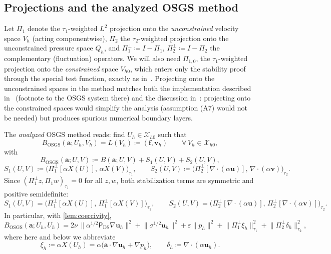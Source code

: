 \documentclass[11pt]{article}
\theoremstyle{remark}
\newcommand{\bu}{\boldsymbol{u}}
\newcommand{\bv}{\boldsymbol{v}}
\newcommand{\ba}{\boldsymbol{a}}
\newcommand{\bff}{\boldsymbol{f}}
\newcommand{\ViscProj}{\mathsf{P}_{\mathrm{DS}}}
\newcommand{\Pone}{\Pi_{1}}
\newcommand{\Ptwo}{\Pi_{2}}
\newcommand{\Ponez}{\Pi_{1,0}}
\newcommand{\Poneo}{\Pi_{1}^{\perp}}
\newcommand{\Ptwoo}{\Pi_{2}^{\perp}}
\newcommand{\Xhz}{\mathcal{X}_{h0}}
\begin{document}
\subsection{Projections and the analyzed OSGS method}
\label{sec:method}

Let $\Pone$ denote the $\tau_1$-weighted $L^2$ projection onto the
\emph{unconstrained} velocity space $V_h$ (acting componentwise), $\Ptwo$ the
$\tau_2$-weighted projection onto the unconstrained pressure space $Q_h$, and
$\Poneo \coloneqq I - \Pone$, $\Ptwoo \coloneqq I - \Ptwo$ the complementary
(fluctuation) operators. We will also need $\Ponez$, the $\tau_1$-weighted projection
onto the \emph{constrained} space $V_{h0}$, which enters only the stability proof
through the special test function, exactly as in~\cite{Codina2008}. Projecting onto the
unconstrained spaces in the method matches both the implementation described
in~\cite{companion} (footnote to the OSGS system there) and the discussion
in~\cite[Remark~1]{Codina2008}: projecting onto the constrained spaces would simplify
the analysis (assumption (A7) would not be needed) but produces spurious numerical
boundary layers.

The \emph{analyzed} OSGS method reads: find $U_h \in \Xhz$ such that
\begin{equation}
  \label{eq:Method}
  B_{\mathrm{OSGS}}(\ba; U_h, V_h) = L(V_h) \coloneqq (\bff, \bv_h)
  \qquad \forall\, V_h \in \Xhz,
\end{equation}
with
\begin{equation}
  \label{eq:Bosgs}
  B_{\mathrm{OSGS}}(\ba; U, V)
  \coloneqq
  B(\ba; U, V) + S_1(U, V) + S_2(U, V),
\end{equation}
\begin{equation}
  \label{eq:Sdefs}
  S_1(U, V) \coloneqq \bigl( \Poneo[\alpha X(U)],\, \alpha X(V) \bigr)_{\tau_1},
  \qquad
  S_2(U, V) \coloneqq \bigl( \Ptwoo[\nabla\cdot(\alpha\bu)],\, \nabla\cdot(\alpha\bv) \bigr)_{\tau_2}.
\end{equation}
Since $(\Poneo z, \Pone w)_{\tau_1} = 0$ for all $z, w$, both stabilization terms are
symmetric and positive semidefinite:
\begin{equation}
  \label{eq:Ssym}
  S_1(U, V) = \bigl( \Poneo[\alpha X(U)],\, \Poneo[\alpha X(V)] \bigr)_{\tau_1},
  \qquad
  S_2(U, V) = \bigl( \Ptwoo[\nabla\cdot(\alpha\bu)],\, \Ptwoo[\nabla\cdot(\alpha\bv)] \bigr)_{\tau_2}.
\end{equation}
In particular, with \cref{lem:coercivity},
\begin{equation}
  \label{eq:Diagonal}
  B_{\mathrm{OSGS}}(\ba; U_h, U_h)
  = 2\nu\,\bigl\lVert \alpha^{1/2}\ViscProj\nabla\bu_h \bigr\rVert^2
  + \bigl\lVert\sigma^{1/2}\bu_h\bigr\rVert^2
  + \varepsilon\bigl\lVert p_h\bigr\rVert^2
  + \bigl\lVert\Poneo \xi_h\bigr\rVert_{\tau_1}^2
  + \bigl\lVert\Ptwoo \delta_h\bigr\rVert_{\tau_2}^2,
\end{equation}
where here and below we abbreviate
\begin{equation}
  \label{eq:XiDelta}
  \xi_h \coloneqq \alpha X(U_h) = \alpha\bigl(\ba\cdot\nabla\bu_h + \nabla p_h\bigr),
  \qquad
  \delta_h \coloneqq \nabla\cdot(\alpha\bu_h).
\end{equation}
\end{document}
